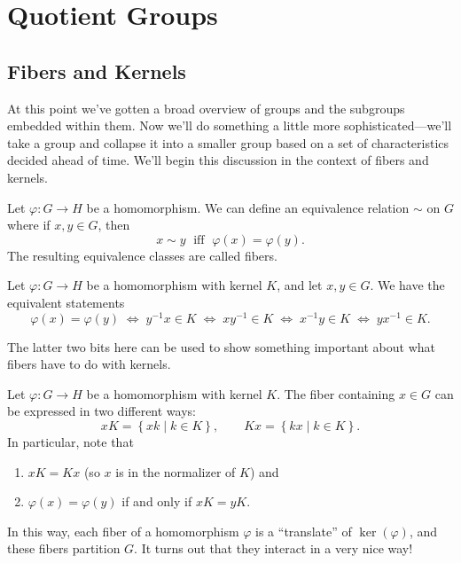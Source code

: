 \documentclass[../m171main.tex]{subfiles}
\begin{document}
\chapter{Quotient Groups}
\section{Fibers and Kernels}
At this point we've gotten a broad overview of groups and the subgroups embedded within them.
Now we'll do something a little more sophisticated---we'll take a group and collapse it into a smaller group based on a set of characteristics decided ahead of time.
We'll begin this discussion in the context of fibers and kernels.

\begin{definition}[Fiber]
    Let $\varphi : G \to H$ be a homomorphism.
    We can define an equivalence relation $\sim$ on $G$ where if $x,y \in G$, then
    \[ x \sim y \;\textrm{ iff }\; \varphi(x) = \varphi(y). \]
    The resulting equivalence classes are called fibers.
\end{definition}

\begin{theorem}[]
    Let $\varphi : G \to H$ be a homomorphism with kernel $K$, and let $x,y \in G$.
    We have the equivalent statements
    \[ \varphi(x) = \varphi(y) \;\iff\; y^{-1} x \in K \;\iff\; xy^{-1} \in K \;\iff\; x^{-1}y \in K \;\iff\; yx^{-1} \in K. \]
\end{theorem}

The latter two bits here can be used to show something important about what fibers have to do with kernels.

\begin{theorem}[]
    Let $\varphi : G \to H$ be a homomorphism with kernel $K$.
    The fiber containing $x \in G$ can be expressed in two different ways:
    \[ xK = \left\{ xk \mid k \in K \right\}, \qquad Kx = \left\{ kx \mid k \in K \right\}. \]
    In particular, note that
    \begin{enumerate}[label=(\alph*)]
        \item $xK = Kx$ (so $x$ is in the normalizer of $K$) and
        \item $\varphi(x) = \varphi(y)$ if and only if $xK = yK$.
    \end{enumerate}
\end{theorem}

In this way, each fiber of a homomorphism $\varphi$ is a ``translate'' of $\ker(\varphi)$, and these fibers partition $G$.
It turns out that they interact in a very nice way!
\end{document}
